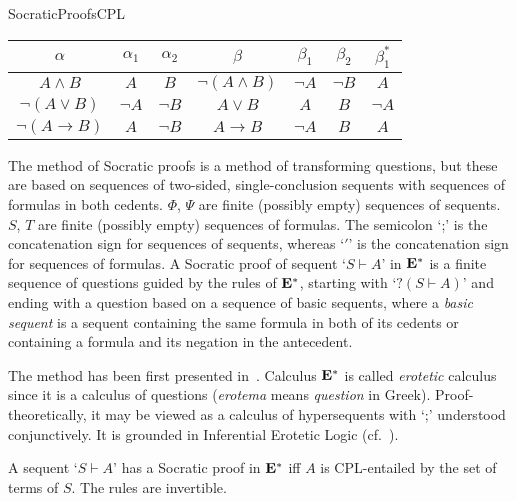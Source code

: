 \begin{entry}{SocraticProofsCPL}
\begin{calculus}
\begin{center}
	\begin{tabular}{ccc|cccc}
			\hline 
		$\alpha$ & $\alpha_{1}$ & $\alpha_{2}$ & $\beta$ & $\beta_{1}$ & $\beta_{2}$ & $\beta^{*}_{1}$  \\ 
			\hline
		$\textit{A}\wedge B$ & $\textit{A}$ & $\textit{B}$ & $\neg(A\wedge B)$ & $\neg A$ & $\neg B$ & $A$ \\
			
		$\neg(A\vee B)$ & $\neg A$ & $\neg B$ & $\textit{A}\vee B$ & $\textit{A}$ & $\textit{B}$ & $\neg A$ \\
			
		$\neg(A \rightarrow B)$ & $\textit{A}$ & $\neg B$ & $\textit{A} \rightarrow B$ & $\neg A$ & $\textit{B}$ & $A$ \\
	\end{tabular}
\end{center}

\end{calculus}

\begin{clarifications}
The method of Socratic proofs is a method of transforming questions, but these are based on sequences of two-sided, single-conclusion sequents with sequences of formulas in both cedents. $\Phi$, $\Psi$ are finite (possibly empty) sequences of sequents. $S$, $T$ are finite (possibly empty) sequences of formulas. The semicolon `;' is the concatenation sign for sequences of sequents, whereas `$'$' is the concatenation sign for sequences of formulas. A Socratic proof of sequent `$S \vdash A$' in $\mathbf{E}^*$ is a finite sequence of questions guided by the rules of $\mathbf{E}^*$, starting with `$? (S \vdash A)$' and ending with a question based on a sequence of basic sequents, where a \textit{basic sequent} is a sequent containing the same formula in both of its cedents or containing a formula and its negation in the antecedent.
\end{clarifications}

\begin{history}
The method has been first presented in~\cite{AW:2004}. Calculus $\mathbf{E}^*$ is called \textit{erotetic} calculus since it is a calculus of questions (\textit{erotema} means \textit{question} in Greek). Proof-theoretically, it may be viewed as a calculus of hypersequents with `;' understood conjunctively. It is grounded in Inferential Erotetic Logic (cf.~\cite{AW:2013}).
\end{history}

\begin{technicalities}
A sequent `$S \vdash A$' has a Socratic proof in $\mathbf{E}^*$ iff $A$ is CPL-entailed by the set of terms of $S$. The rules are invertible.
\end{technicalities}












\end{entry}
